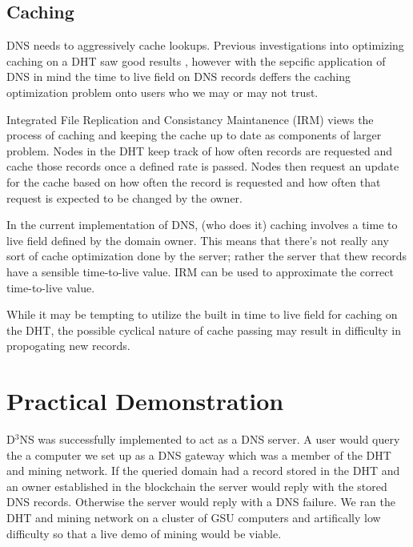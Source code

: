 \documentclass[11pt]{IEEEtran} %
\begin{document}
\subsection{Caching}
DNS needs to aggressively cache lookups. Previous investigations into optimizing caching on a DHT saw good results \cite{irm}, however with the sepcific application of DNS in mind the time to live field on DNS records deffers the caching optimization problem onto users who we may or may not trust.

Integrated File Replication and Consistancy Maintanence (IRM) \cite{irm} views the process of caching and keeping the cache up to date as components of larger problem.  Nodes in the DHT keep track of how often records are requested and cache those records once a defined rate is passed.  Nodes then request an update for the cache based on how often the record is requested and how often that request is expected to be changed by the owner.


In the current implementation of DNS, (who does it) caching involves a time to live field defined by the domain owner. This means that there's not really any sort of cache optimization done by the server; rather the server that thew records have a sensible time-to-live value. IRM \cite{irm}  can be used to approximate the correct time-to-live value.

While it may be tempting to utilize the built in time to live field for caching on the DHT, the possible cyclical nature of cache passing may result in difficulty in propogating new records.

\section{Practical Demonstration}
D$^3$NS was successfully implemented to act as a DNS server.  A user would query the a computer we set up as a DNS gateway which was a member of the DHT and mining network. If the queried domain had a record stored in the DHT and an owner established in the blockchain the server would reply with the stored DNS records. Otherwise the server would reply with a DNS failure. We ran the DHT and mining network on a cluster of GSU computers and artifically low difficulty so that a live demo of mining would be viable.
\end{document}
